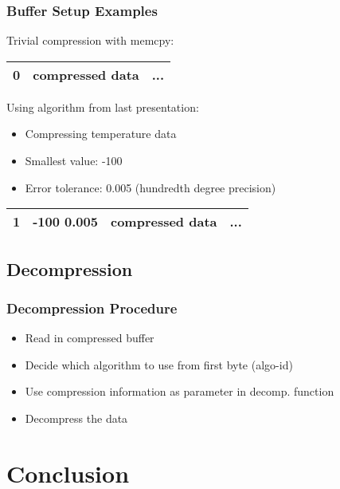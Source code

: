 \documentclass[compress]{beamer}
\begin{document}
\begin{frame}
	\frametitle{Buffer Setup Examples}

	Trivial compression with memcpy:\\
	\begin{center}
	\begin{tabular}{|c||cc|}
		\hline
		0 & compressed data & ... \\
		\hline
	\end{tabular}
	\end{center}

	\bigskip
	\pause

	Using algorithm from last presentation:\\
	\begin{itemize}
		\item Compressing temperature data
		\item Smallest value: -100
		\item Error tolerance: 0.005 (hundredth degree precision)
	\end{itemize}
	\begin{center}
	\begin{tabular}{|c|c|cc|}
		\hline
		1 & -100 0.005 & compressed data & ... \\
		\hline
	\end{tabular}
	\end{center}

\end{frame}

\subsection{Decompression}

\begin{frame}
	\frametitle{Decompression Procedure}

	\begin{itemize}
		\item Read in compressed buffer
		\item Decide which algorithm to use from first byte (algo-id)
		\item Use compression information as parameter in decomp. function
		\item Decompress the data

	\end{itemize}
\end{frame}

\section{Conclusion}
\end{document}
